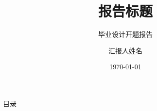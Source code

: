 \documentclass[aspectratio=169]{beamer}
\title{报告标题}
\subtitle{毕业设计开题报告}
\author{汇报人姓名}
\institute[学院名称]{学院名称\\专业与班级}
\date{\today}
\begin{document}
\heiti
\CUMTMakeTitle
\begin{frame}{目录}
  \tableofcontents
\end{frame}

\CUMTMakeThanks
\end{document}
